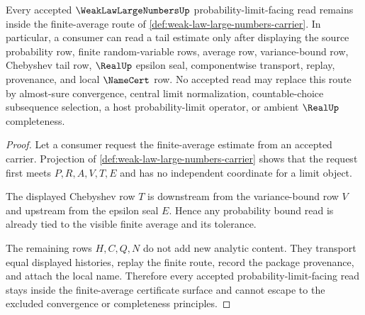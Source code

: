 \begin{theorem}\label{thm:weak-law-large-numbers-finite-average-nonescape}
Every accepted $\WeakLawLargeNumbersUp$ probability-limit-facing read remains inside the finite-average route of \autoref{def:weak-law-large-numbers-carrier}. In particular, a consumer can read a tail estimate only after displaying the source probability row, finite random-variable rows, average row, variance-bound row, Chebyshev tail row, $\RealUp$ epsilon seal, componentwise transport, replay, provenance, and local $\NameCert$ row. No accepted read may replace this route by almost-sure convergence, central limit normalization, countable-choice subsequence selection, a host probability-limit operator, or ambient $\RealUp$ completeness.
\end{theorem}
\begin{proof}
Let a consumer request the finite-average estimate from an accepted carrier. Projection of \autoref{def:weak-law-large-numbers-carrier} shows that the request first meets $P,R,A,V,T,E$ and has no independent coordinate for a limit object.

The displayed Chebyshev row $T$ is downstream from the variance-bound row $V$ and upstream from the epsilon seal $E$. Hence any probability bound read is already tied to the visible finite average and its tolerance.

The remaining rows $H,C,Q,N$ do not add new analytic content. They transport equal displayed histories, replay the finite route, record the package provenance, and attach the local name. Therefore every accepted probability-limit-facing read stays inside the finite-average certificate surface and cannot escape to the excluded convergence or completeness principles.
\end{proof}

\begin{closurestatus}{\WeakLawLargeNumbersUp}
  \theoryclosure{\seedClosure}
  \formalstatus{\unformalizedV}
\end{closurestatus}
